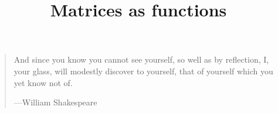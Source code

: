 \documentclass{ximera}
\title{Matrices as functions}
\begin{document}
\begin{abstract}
\end{abstract}
\maketitle

\begin{quote}
And since you know you cannot see yourself, so well as by reflection,
I, your glass, will modestly discover to yourself, that of yourself
which you yet know not of.

\hfill---William Shakespeare
\end{quote}
\end{document}
